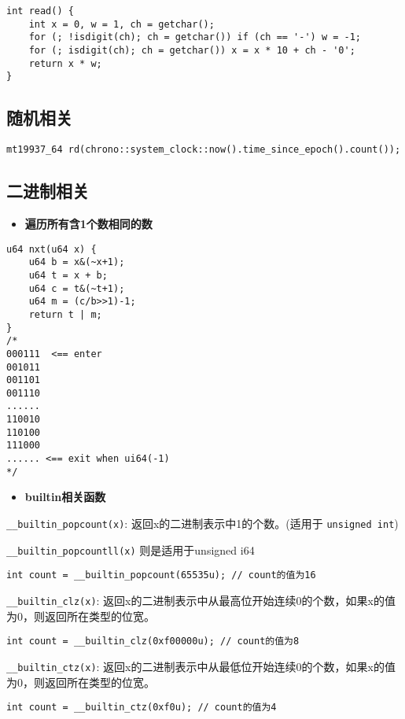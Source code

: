 \documentclass[a4paper,landscape,twocolumn]{ctexart}
\newcommand{\point}[1]{
	\begin{itemize}
		\item \textbf{#1}
	\end{itemize}
}
\begin{document}
\begin{lstlisting}
int read() {
	int x = 0, w = 1, ch = getchar();
	for (; !isdigit(ch); ch = getchar()) if (ch == '-') w = -1;
	for (; isdigit(ch); ch = getchar()) x = x * 10 + ch - '0';
	return x * w;
}
\end{lstlisting}

\subsection{随机相关}

\begin{lstlisting}
mt19937_64 rd(chrono::system_clock::now().time_since_epoch().count());
\end{lstlisting}

\subsection{二进制相关}

\point{遍历所有含1个数相同的数}

\begin{lstlisting}
u64 nxt(u64 x) {
	u64 b = x&(~x+1);
	u64 t = x + b;
	u64 c = t&(~t+1);
	u64 m = (c/b>>1)-1;
	return t | m;
}
/*
000111  <== enter
001011
001101
001110
......
110010
110100
111000
...... <== exit when ui64(-1)
*/
\end{lstlisting}

\point{builtin相关函数}

\texttt{\_\_builtin\_popcount(x)}: 返回x的二进制表示中1的个数。(适用于 \texttt{unsigned int})

\texttt{\_\_builtin\_popcountll(x)} 则是适用于unsigned i64

\begin{lstlisting}
int count = __builtin_popcount(65535u); // count的值为16
\end{lstlisting}

\texttt{\_\_builtin\_clz(x)}: 返回x的二进制表示中从最高位开始连续0的个数，如果x的值为0，则返回所在类型的位宽。

\begin{lstlisting}
int count = __builtin_clz(0xf00000u); // count的值为8
\end{lstlisting}

\texttt{\_\_builtin\_ctz(x)}: 返回x的二进制表示中从最低位开始连续0的个数，如果x的值为0，则返回所在类型的位宽。

\begin{lstlisting}
int count = __builtin_ctz(0xf0u); // count的值为4
\end{lstlisting}
\end{document}

